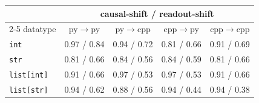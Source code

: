 \begin{tabular}{lcccc}
\toprule
& \multicolumn{4}{c}{causal-shift / readout-shift} \\
\cmidrule(lr){2-5}
datatype & py$\to$py & py$\to$cpp & cpp$\to$py & cpp$\to$cpp \\
\midrule
\texttt{int} & 0.97 / 0.84 & 0.94 / 0.72 & 0.81 / 0.66 & 0.91 / 0.69 \\
\texttt{str} & 0.81 / 0.66 & 0.84 / 0.56 & 0.84 / 0.59 & 0.81 / 0.66 \\
\texttt{list[int]} & 0.91 / 0.66 & 0.97 / 0.53 & 0.97 / 0.53 & 0.91 / 0.66 \\
\texttt{list[str]} & 0.94 / 0.62 & 0.88 / 0.56 & 0.94 / 0.44 & 0.94 / 0.38 \\
\bottomrule
\end{tabular}

